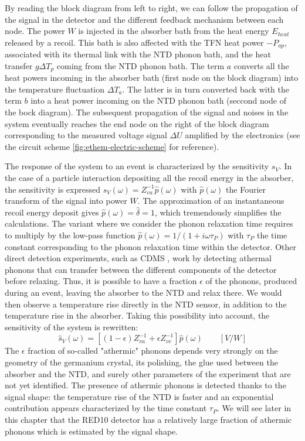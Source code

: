 By reading the block diagram from left to right, we can follow the propagation of the signal in the detector and the different feedback mechanism between each node. The power $W$ is injected in the absorber bath from the heat energy $E_{heat}$ released by a recoil. This bath is also affected with the TFN heat power $-P_{ap}$, associated with its thermal link with the NTD phonon bath, and the heat transfer $g \Delta T_p$ coming from the NTD phonon bath. The term $a$ converts all the heat powers incoming in the absorber bath (first node on the block diagram) into the temperature fluctuation $\Delta T_a$. The latter is in turn converted back with the term $b$ into a heat power incoming on the NTD phonon bath (seccond node of the bock diagram). The subsequent propagation of the signal and noises in the system eventually reaches the end node on the right of the block diagram corresponding to the measured voltage signal $\Delta U$ amplified by the electronics (see the circuit scheme \ref{fig:ethem-electric-scheme} for reference).


The response of the system to an event is characterized by the sensitivity $s_V$. In the case of a particle interaction depositing all the recoil energy in the absorber, the sensitivity is expressed ${s}_V(\omega) = Z_{va}^{-1}\hat{p}(\omega)$ with $\hat{p}(\omega)$ the Fourier transform of the signal into power $W$. The approximation of an instantaneous recoil energy deposit gives $\hat{p}(\omega) = \hat{\delta} = 1$, which tremendously simplifies the calculations.
The variant where we consider the phonon relaxation time requires to multiply by the low-pass function $\hat{p}(\omega) = 1/(1+i\omega \tau_P)$ with $\tau_P$ the time constant corresponding to the phonon relaxation time within the detector.
Other direct detection experiments, such as CDMS 
, work by detecting athermal phonons that can transfer between the different components of the detector before relaxing. Thus, it is possible to have a fraction $\epsilon$ of the phonons, produced during an event, leaving the absorber to the NTD and relax there. We would then observe a temperature rise directly in the NTD sensor, in addition to the temperature rise in the absorber. Taking this possibility into account, the sensitivity of the system is rewritten:
\begin{equation}
\label{sv}
\hat{s}_V(\omega) = \left[(1-\epsilon) Z_{va}^{-1} + \epsilon Z_{ve}^{-1}\right]\hat{p}(\omega) \qquad [V/W]
\end{equation}
The $\epsilon$ fraction of so-called "athermic" phonons depends very strongly on the geometry of the germanium crystal, its polishing, the glue used between the absorber and the NTD, and surely other parameters of the experiment that are not yet identified. The presence of athermic phonons is detected thanks to the signal shape: the temperature rise of the NTD is faster and an exponential contribution appears characterized by the time constant $\tau_P$. We will see later in this chapter that the RED10 detector has a relatively large fraction of athermic phonons which is estimated by the signal shape.

